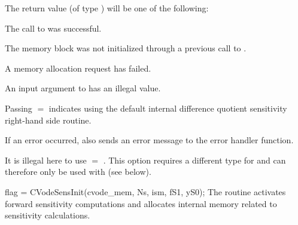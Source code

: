 {
  The return value  (of type ) will be one of the following:
  \begin{args}
  \item[\Id{CV\_SUCCESS}]
    The call to  was successful.
  \item[\Id{CV\_MEM\_NULL}] 
    The {\cvodes} memory block was not initialized through a 
    previous call to .
  \item[\Id{CV\_MEM\_FAIL}] 
    A memory allocation request has failed.
  \item[\Id{CV\_ILL\_INPUT}] 
    An input argument to  has an illegal value.
  \end{args}
}
{
  Passing $=$ indicates using the default internal difference 
  quotient sensitivity right-hand side routine.

  If an error occurred,  also sends an error message to the
  error handler function.

  {\warn}It is illegal here to use  $=$ . This option
  requires a different type for  and can therefore only be used with
   (see below).
}
{
  flag = CVodeSensInit(cvode\_mem, Ns, ism, fS1, yS0);
}
{
  The routine  activates forward sensitivity computations and
  allocates internal memory related to sensitivity calculations.
}
